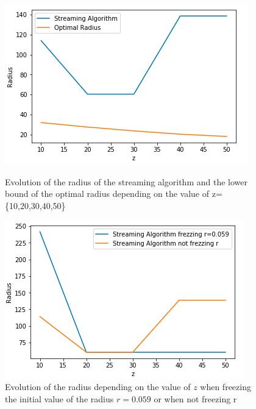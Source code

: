 \documentclass[a4paper,11pt,openany]{article}
\begin{document}
\begin{figure}[H]
\centering
\begin{minipage}{.45\textwidth}
  \begin{center}
  \includegraphics[scale=0.55]{Images/optimal_decreases}
  \caption{Evolution of the radius of the streaming algorithm and the lower bound of the optimal radius depending on the value of z=\{10,20,30,40,50\}}
  \label{fig:optimal_decreases}
  \end{center}
\end{minipage}%
\hfill
\begin{minipage}{.45\textwidth}
  \begin{center}
  \includegraphics[scale=0.5]{Images/fix_begining}
  \caption{Evolution of the radius depending on the value of $z$ when freezing the initial value of the radius $r=0.059$ or when not freezing r}
  \label{fig:fix_begining}
  \end{center}
\end{minipage}
\end{figure}
\end{document}
